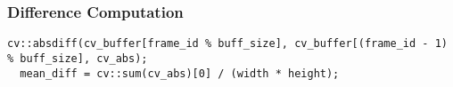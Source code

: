 \subsubsection{Difference Computation}
\label{subsubsec:difference_computation}




\begin{lstlisting}[style=C++]
  cv::absdiff(cv_buffer[frame_id % buff_size], cv_buffer[(frame_id - 1) % buff_size], cv_abs);
  mean_diff = cv::sum(cv_abs)[0] / (width * height);
\end{lstlisting}
